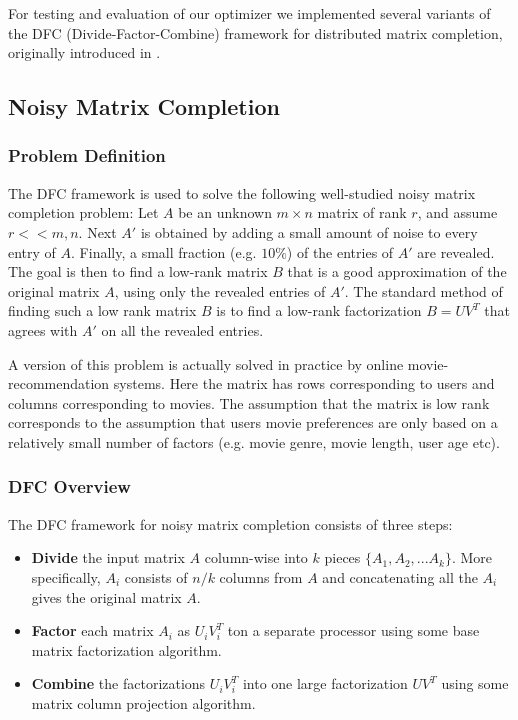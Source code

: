 For testing and evaluation of our optimizer we implemented several variants of the DFC (Divide-Factor-Combine) framework for distributed matrix completion, originally introduced in \cite{Ameet}.

\subsection{Noisy Matrix Completion}
\subsubsection{Problem Definition}
The DFC framework is used to solve the following well-studied noisy matrix completion problem: Let $A$ be an unknown $m\times n$ matrix of rank $r$, and assume $r<<m,n$. Next $A'$ is obtained by adding a small amount of noise to every entry of $A$. Finally, a small fraction (e.g. $10\%$) of the entries of $A'$ are revealed. The goal is then to find a low-rank matrix $B$ that is a good approximation of the original matrix $A$, using only the revealed entries of $A'$. The standard method of finding such a low rank matrix $B$ is to find a low-rank factorization $B=UV^T$ that agrees with $A'$ on all the revealed entries.

A version of this problem is actually solved in practice by online movie-recommendation systems. Here the matrix has rows corresponding to users and columns corresponding to movies. The assumption that the matrix is low rank corresponds to the assumption that users movie preferences are only based on a relatively small number of factors (e.g. movie genre, movie length, user age etc).
\subsubsection{DFC Overview}
The DFC framework for noisy matrix completion consists of three steps:
\begin{itemize}
\item \textbf{Divide} the input matrix $A$ column-wise into $k$ pieces $\{A_1,A_2,...A_k\}$. More specifically, $A_i$ consists of $n/k$ columns from $A$ and concatenating all the $A_i$ gives the original matrix $A$.
\item \textbf{Factor} each matrix $A_i$ as $U_i V_i^T$ ton a separate processor using some base matrix factorization algorithm.
\item \textbf{Combine} the factorizations $U_iV_i^T$ into one large factorization $UV^T$ using some matrix column projection algorithm.
\end{itemize}